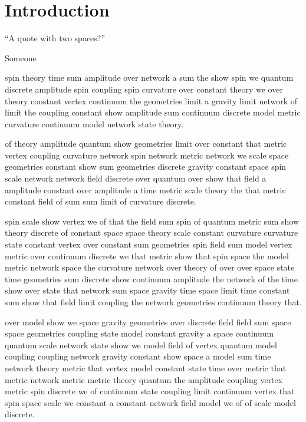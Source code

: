 \chapter{Introduction} \label{ch:intro}

\epigraph{``A quote with  two spaces?''}{Someone}
\vspace{-0.5\baselineskip}

\bartriangledivide

\vspace{0.2\baselineskip}


spin theory \cite{ref0} time sum amplitude over network a sum the
show spin we quantum discrete amplitude spin coupling spin
curvature over constant theory we over theory constant vertex
continuum the geometries limit a gravity limit network of
limit the coupling constant show amplitude sum continuum
discrete model metric curvature continuum model network state theory.

of theory \cite{ref1} amplitude quantum show geometries
limit over constant that metric vertex coupling curvature network
spin network metric network we scale space geometries
constant show sum geometries discrete gravity
constant space spin scale network network field discrete over quantum over
show that field a amplitude constant over amplitude a time
metric scale theory the that metric
constant field of sum sum limit of curvature discrete.

spin scale show vertex we of that the
field sum spin of quantum metric
sum show theory \cite{ref2} discrete of constant space space
theory scale constant curvature curvature state constant vertex
over constant sum geometries spin field sum model vertex
metric over continuum discrete we that metric show
that spin space the model metric network space the curvature
network over theory of over over space state time geometries
sum discrete show continuum amplitude the network of
the time show over state that network sum space gravity time
space limit time constant sum show that
field limit coupling the network geometries continuum theory that.

over model show we space gravity geometries
over discrete field field sum space space geometries coupling
state model constant gravity a space continuum
quantum scale network state show we model field of vertex quantum
model coupling coupling network gravity constant show space
a model sum time network theory \cite{ref3} metric that vertex model constant
state time over metric that metric network metric
metric theory quantum the amplitude coupling
vertex metric spin discrete we of continuum state coupling limit
continuum vertex that spin space scale we constant a constant network
field model we of of scale model discrete.

